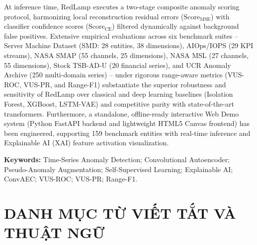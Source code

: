\documentclass[11pt,journal,onecolumn]{IEEEtran}
\begin{document}
At inference time, RedLamp executes a two-stage composite anomaly scoring protocol, harmonizing local reconstruction residual errors ($\text{Score}_{\text{MSE}}$) with classifier confidence scores ($\text{Score}_{\text{CE}}$) filtered dynamically against background false positives. Extensive empirical evaluations across six benchmark suites -- Server Machine Dataset (SMD: 28 entities, 38 dimensions), AIOps/IOPS (29 KPI streams), NASA SMAP (55 channels, 25 dimensions), NASA MSL (27 channels, 55 dimensions), Stock TSB-AD-U (20 financial series), and UCR Anomaly Archive (250 multi-domain series) -- under rigorous range-aware metrics (VUS-ROC, VUS-PR, and Range-F1) substantiate the superior robustness and sensitivity of RedLamp over classical and deep learning baselines (Isolation Forest, XGBoost, LSTM-VAE) and competitive parity with state-of-the-art transformers. Furthermore, a standalone, offline-ready interactive Web Demo system (Python FastAPI backend and lightweight HTML5 Canvas frontend) has been engineered, supporting 159 benchmark entities with real-time inference and Explainable AI (XAI) feature activation visualization.

\vspace{0.5cm}
\noindent\textbf{Keywords:} Time-Series Anomaly Detection; Convolutional Autoencoder; Pseudo-Anomaly Augmentation; Self-Supervised Learning; Explainable AI; ConvAEC; VUS-ROC; VUS-PR; Range-F1.

\newpage

\section*{DANH MỤC TỪ VIẾT TẮT VÀ THUẬT NGỮ}
\end{document}
